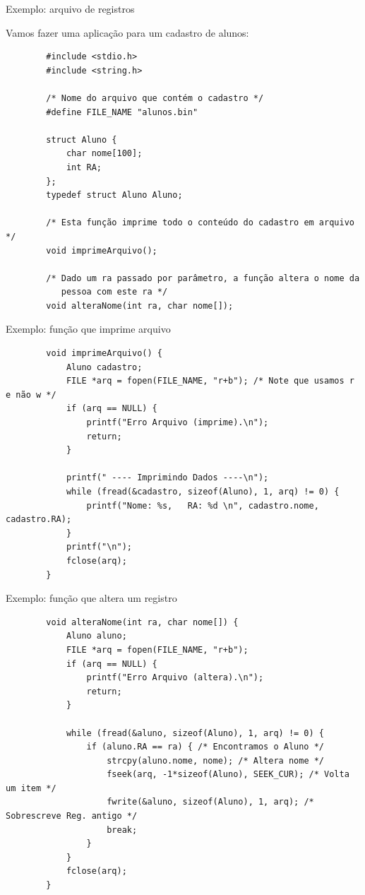 \documentclass[handout]{beamer}
\begin{document}
\begin{frame}[fragile]{Exemplo: arquivo de registros}

    Vamos fazer uma aplicação para um cadastro de alunos:

    \begin{verbatim}
        #include <stdio.h>
        #include <string.h>

        /* Nome do arquivo que contém o cadastro */
        #define FILE_NAME "alunos.bin"

        struct Aluno {
            char nome[100];
            int RA;
        };
        typedef struct Aluno Aluno;

        /* Esta função imprime todo o conteúdo do cadastro em arquivo */
        void imprimeArquivo();

        /* Dado um ra passado por parâmetro, a função altera o nome da
           pessoa com este ra */
        void alteraNome(int ra, char nome[]);
    \end{verbatim}

\end{frame}

\begin{frame}[fragile]{Exemplo: função que imprime arquivo}

    \begin{verbatim}
        void imprimeArquivo() {
            Aluno cadastro;
            FILE *arq = fopen(FILE_NAME, "r+b"); /* Note que usamos r e não w */
            if (arq == NULL) {
                printf("Erro Arquivo (imprime).\n");
                return;
            }

            printf(" ---- Imprimindo Dados ----\n");
            while (fread(&cadastro, sizeof(Aluno), 1, arq) != 0) {
                printf("Nome: %s,   RA: %d \n", cadastro.nome, cadastro.RA);
            }
            printf("\n");
            fclose(arq);
        }
    \end{verbatim}
\end{frame}

\begin{frame}[fragile]{Exemplo: função que altera um registro}

    \begin{verbatim}
        void alteraNome(int ra, char nome[]) {
            Aluno aluno;
            FILE *arq = fopen(FILE_NAME, "r+b");
            if (arq == NULL) {
                printf("Erro Arquivo (altera).\n");
                return;
            }

            while (fread(&aluno, sizeof(Aluno), 1, arq) != 0) {
                if (aluno.RA == ra) { /* Encontramos o Aluno */
                    strcpy(aluno.nome, nome); /* Altera nome */
                    fseek(arq, -1*sizeof(Aluno), SEEK_CUR); /* Volta um item */
                    fwrite(&aluno, sizeof(Aluno), 1, arq); /* Sobrescreve Reg. antigo */
                    break;
                }
            }
            fclose(arq);
        }
    \end{verbatim}

\end{frame}
\end{document}
